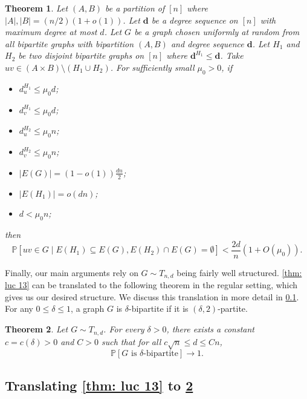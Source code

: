 \documentclass[11pt]{article}
\theoremstyle{plain}
\newtheorem{thm}{Theorem}[section]
\begin{document}
\begin{thm}\label{thm: bip edge probs} \cite{larkin2025subgraphs}
Let $(A,B)$ be a partition of $[n]$ where $|A|, |B| = (n/2)(1 + o(1))$. Let $\mathbf d$ be a degree sequence on $[n]$ with maximum degree at most $d$. Let $G$ be a graph chosen uniformly at random from all bipartite graphs with bipartition $(A,B)$ and degree sequence $\mathbf d$.
Let $H_1$ and $H_2$ be two disjoint bipartite graphs on $[n]$ where $\mathbf{d}^{H_1} \leq \mathbf d$. Take $uv \in (A \times B)\setminus(H_1 \cup H_2)$. For sufficiently small $\mu_0 > 0$, if
\begin{itemize}
    \item $d^{H_1}_u \leq \mu_0d$;
    \item $d^{H_1}_v \leq \mu_0d$; 
    \item $d^{H_2}_u \leq \mu_0n$;
    \item $d^{H_2}_v \leq \mu_0n$;
    \item $|E(G)| = (1 - o(1))\frac{dn}{2}$;
    \item $|E(H_1)| = o(dn)$;
    \item $d < \mu_0n$;
\end{itemize}
then 
    \[
    \mathbb{P}[uv \in G \mathrel | E(H_1) \subseteq E(G), E(H_2)\cap E(G) = \emptyset] < \frac{2d}{n}(1 + O(\mu_0)).
    \]
\end{thm}

Finally, our main arguments rely on $G \sim T_{n,d}$ being fairly well structured. \cref{thm: luc 13} can be translated to the following theorem in the regular setting, which gives us our desired structure. We discuss this translation in more detail in \cref{sec: Luczak}. For any $0 \leq \delta \leq 1$, a graph $G$ is $\delta$-bipartite if it is $(\delta, 2)$-partite.

\begin{thm}\label{thm: Luckzak}\cite{luczak2000triangle}
    Let $G \sim T_{n,d}$. For every $\delta > 0$, there exists a constant $c = c(\delta) > 0$ and $C > 0$ such that for all $c\sqrt n \leq d \leq Cn$,
    \[
    \mathbb P[G \text{ is $\delta$-bipartite}] \rightarrow 1.
    \]
\end{thm}

\subsection{Translating \cref{thm: luc 13} to \cref{thm: Luckzak}}\label{sec: Luczak}
\end{document}
